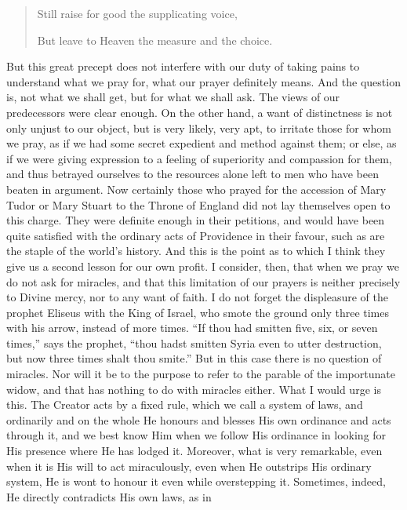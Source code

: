 \begin{quote}

Still raise
for good the supplicating voice,

But leave to Heaven the measure and the choice.

\end{quote}

But this great
precept does not interfere with our duty of taking pains to understand
what we pray for, what our prayer definitely means. And the question
is, not what we shall get, but for what we shall ask. The views of our
predecessors were clear enough. On the other hand, a want of
distinctness is not only unjust to our object, but is very likely,
very apt, to irritate those for whom we pray, as if we had some secret
expedient and method against them; or else, as if we were giving
expression to a feeling of superiority and compassion for them, and
thus betrayed ourselves to the resources alone left to men who have
been beaten in argument. Now certainly those who prayed for the
accession of Mary Tudor or Mary Stuart to the Throne of England did
not lay themselves open to this charge. They were definite enough in
their petitions, and would have been quite satisfied with the ordinary
acts of Providence in their favour, such as are the staple of the
world's history. And this is the point as to which I think they give
us a second lesson for our own profit. I consider, then, that when we
pray we do not ask for miracles, and that this limitation of our
prayers is neither precisely to Divine mercy, nor to any want of
faith. I do not forget the displeasure of the prophet Eliseus with the
King of Israel, who smote the ground only three times with his arrow,
instead of more times. ``If thou had smitten five, six, or seven times,''
says the prophet, ``thou hadst smitten Syria even to utter destruction,
but now three times shalt thou smite.'' But in this case there is no
question of miracles. Nor will it be to the purpose to refer to the
parable of the importunate widow, and that has nothing to do with
miracles either. What I would urge is this. The Creator acts by a
fixed rule, which we call a system of laws, and ordinarily and on the
whole He honours and blesses His own ordinance and acts through it,
and we best know Him when we follow His ordinance in looking for His
presence where He has lodged it. Moreover, what is very remarkable,
even when it is His will to act miraculously, even when He outstrips
His ordinary system, He is wont to honour it even while overstepping
it. Sometimes, indeed, He directly contradicts His own laws, as in
